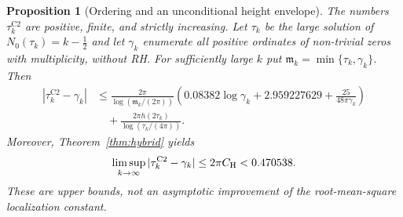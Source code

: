 \documentclass[11pt,reqno]{amsart}
\numberwithin{equation}{section}
\newtheorem{proposition}[theorem]{Proposition}
\theoremstyle{definition}
\theoremstyle{remark}
\newcommand{\GreenC}{2.959227629}
\newcommand{\GreenA}{0.08382}
\begin{document}
\begin{proposition}[Ordering and an unconditional height envelope]
\label{prop:tauC2_v6}
The numbers $\tau_k^{\mathrm{C2}}$ are positive, finite, and
strictly increasing. Let $\tau_k$ be the large solution of
$N_0(\tau_k)=k-\frac12$ and let $\gamma_k$ enumerate all positive
ordinates of non-trivial zeros with multiplicity, without RH.
For sufficiently large $k$ put
$\mathfrak m_k=\min\{\tau_k,\gamma_k\}$. Then
\begin{equation}
\begin{aligned}
 |\tau_k^{\mathrm{C2}}-\gamma_k|
 &\le\frac{2\pi}{\log(\mathfrak m_k/(2\pi))}
   \left(\GreenA\log\gamma_k+\GreenC
             +\frac{25}{48\pi\gamma_k}\right)\\
 &\quad+\frac{2\pi h(2\tau_k)}{\log(\tau_k/(4\pi))}.
\end{aligned}
\label{eq:tauC2_explicit_v6}
\end{equation}
Moreover, Theorem~\ref{thm:hybrid} yields
\begin{equation}
 \limsup_{k\to\infty}|\tau_k^{\mathrm{C2}}-\gamma_k|
 \le 2\pi C_{\rm H}<0.470538.
 \label{eq:tauC2_limsup_v6}
\end{equation}
These are upper bounds, not an asymptotic improvement of the
root-mean-square localization constant.
\end{proposition}
\end{document}
